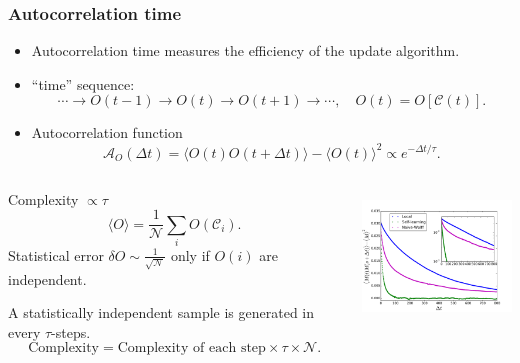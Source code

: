 \documentclass[xcolor=table, 10pt, aspectratio=169]{beamer}
\begin{document}
\begin{frame}
  \frametitle{Autocorrelation time}
  \begin{itemize}
    \item Autocorrelation time measures the efficiency of the update algorithm.
    \item ``time'' sequence:
    \[\cdots\rightarrow O(t-1)\rightarrow O(t)\rightarrow O(t+1)\rightarrow\cdots,
  \quad O(t) = O[\mathcal C(t)].\]
    \item Autocorrelation function
    \[\mathcal A_O(\Delta t)=\langle O(t)O(t+\Delta t)\rangle - \langle O(t)\rangle^2\propto e^{-\Delta t/\tau}.\]
  \end{itemize}
  \begin{columns}
    \begin{block}{Complexity $\propto \tau$}
      \[\langle O\rangle = \frac1{\mathcal N}\sum_iO(\mathcal C_i).\]
      Statistical error $\delta O\sim\frac1{\sqrt{\mathcal N}}$ only if $O(i)$ are independent.

A statistically independent sample is generated in every $\tau$-steps.
\[\text{Complexity}=\text{Complexity of each step}\times\tau\times\mathcal N.\]
    \end{block}
    \centering
    \includegraphics[height=3.5cm]{auto_decay}
  \end{columns}
\end{frame}
\end{document}
